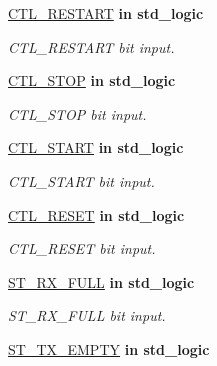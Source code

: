 \begin{DoxyCompactItemize}
\hyperlink{classi2c__master__engine_afd3b0f78afdb8a56021a75cc0f03c69f}{C\+T\+L\+\_\+\+R\+E\+S\+T\+A\+RT}  {\bfseries {\bfseries \textcolor{vhdlchar}{in}\textcolor{vhdlchar}{ }}} {\bfseries \textcolor{vhdlchar}{std\+\_\+logic}\textcolor{vhdlchar}{ }} 
\begin{DoxyCompactList}\small\item\em C\+T\+L\+\_\+\+R\+E\+S\+T\+A\+RT bit input. \end{DoxyCompactList}\item 
\hyperlink{classi2c__master__engine_a1f6f5c161032ed17eaabd45b23e13dfa}{C\+T\+L\+\_\+\+S\+T\+OP}  {\bfseries {\bfseries \textcolor{vhdlchar}{in}\textcolor{vhdlchar}{ }}} {\bfseries \textcolor{vhdlchar}{std\+\_\+logic}\textcolor{vhdlchar}{ }} 
\begin{DoxyCompactList}\small\item\em C\+T\+L\+\_\+\+S\+T\+OP bit input. \end{DoxyCompactList}\item 
\hyperlink{classi2c__master__engine_a7109500384a30f28579c6b6e8ff76d2f}{C\+T\+L\+\_\+\+S\+T\+A\+RT}  {\bfseries {\bfseries \textcolor{vhdlchar}{in}\textcolor{vhdlchar}{ }}} {\bfseries \textcolor{vhdlchar}{std\+\_\+logic}\textcolor{vhdlchar}{ }} 
\begin{DoxyCompactList}\small\item\em C\+T\+L\+\_\+\+S\+T\+A\+RT bit input. \end{DoxyCompactList}\item 
\hyperlink{classi2c__master__engine_aa99e93d425b572e26ef2fb36b29d9c86}{C\+T\+L\+\_\+\+R\+E\+S\+ET}  {\bfseries {\bfseries \textcolor{vhdlchar}{in}\textcolor{vhdlchar}{ }}} {\bfseries \textcolor{vhdlchar}{std\+\_\+logic}\textcolor{vhdlchar}{ }} 
\begin{DoxyCompactList}\small\item\em C\+T\+L\+\_\+\+R\+E\+S\+ET bit input. \end{DoxyCompactList}\item 
\hyperlink{classi2c__master__engine_a1548127b2c9f2b2fdee1c239d951a5a5}{S\+T\+\_\+\+R\+X\+\_\+\+F\+U\+LL}  {\bfseries {\bfseries \textcolor{vhdlchar}{in}\textcolor{vhdlchar}{ }}} {\bfseries \textcolor{vhdlchar}{std\+\_\+logic}\textcolor{vhdlchar}{ }} 
\begin{DoxyCompactList}\small\item\em S\+T\+\_\+\+R\+X\+\_\+\+F\+U\+LL bit input. \end{DoxyCompactList}\item 
\hyperlink{classi2c__master__engine_aac728a86d700109f366b38560f6e3ada}{S\+T\+\_\+\+T\+X\+\_\+\+E\+M\+P\+TY}  {\bfseries {\bfseries \textcolor{vhdlchar}{in}\textcolor{vhdlchar}{ }}} {\bfseries \textcolor{vhdlchar}{std\+\_\+logic}\textcolor{vhdlchar}{ }} 

\end{DoxyCompactItemize}
